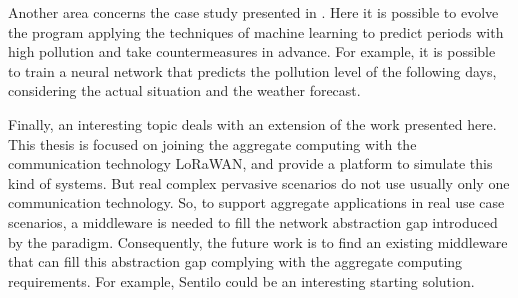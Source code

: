 Another area concerns the case study presented in . 
Here it is possible to evolve the program applying the techniques of machine learning to predict periods with high pollution and take countermeasures in advance. 
For example, it is possible to train a neural network that predicts the pollution level of the following days, considering the actual situation and the weather forecast.

Finally, an interesting topic deals with an extension of the work presented here.
This thesis is focused on joining the aggregate computing with the communication technology LoRaWAN, and provide a platform to simulate this kind of systems.
But real complex pervasive scenarios do not use usually only one communication technology.
So, to support aggregate applications in real use case scenarios, a middleware is needed to fill the network abstraction gap introduced by the paradigm.
Consequently, the future work is to find an existing middleware that can fill this abstraction gap complying with the aggregate computing requirements. For example, Sentilo could be an interesting starting solution.

\iffalse
Finally, it exists an interesting topic not directly correlated with the DingNet simulator, but more aggregate system.
In the introduction of this thesis has been cited the platform Sentilo, as enabling platform to design pervasive system, abstracting from the communication technology of its devices.
So the topic is to study if it is possible to use the platform Sentilo, or a similar one, to fill part of the abstraction gap introduced from the aggregate computing paradigm.
\fi